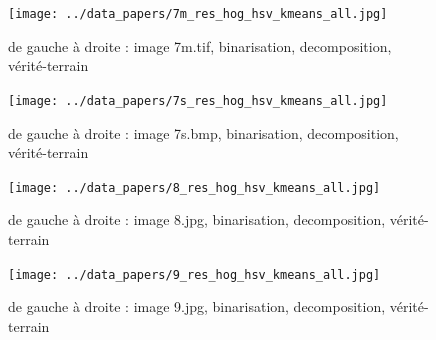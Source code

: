 \documentclass{book}
\begin{document}
\begin{figure}[H]
\begin{center}
\texttt{[image: ../data\_papers/7m\_res\_hog\_hsv\_kmeans\_all.jpg]}
\end{center}
\caption{de gauche à droite : image 7m.tif, binarisation, decomposition, vérité-terrain}
\label{7m}
\end{figure}
\clearpage


\begin{figure}[H]
\begin{center}
\texttt{[image: ../data\_papers/7s\_res\_hog\_hsv\_kmeans\_all.jpg]}
\end{center}
\caption{de gauche à droite : image 7s.bmp, binarisation, decomposition, vérité-terrain}
\label{7s}
\end{figure}
\clearpage


\begin{figure}[H]
\begin{center}
\texttt{[image: ../data\_papers/8\_res\_hog\_hsv\_kmeans\_all.jpg]}
\end{center}
\caption{de gauche à droite : image 8.jpg, binarisation, decomposition, vérité-terrain}
\label{8}
\end{figure}
\clearpage


\begin{figure}[H]
\begin{center}
\texttt{[image: ../data\_papers/9\_res\_hog\_hsv\_kmeans\_all.jpg]}
\end{center}
\caption{de gauche à droite : image 9.jpg, binarisation, decomposition, vérité-terrain}
\label{9}
\end{figure}
\clearpage


\clearpage

\backmatter

\listoftables

\listoffigures



\end{document}
